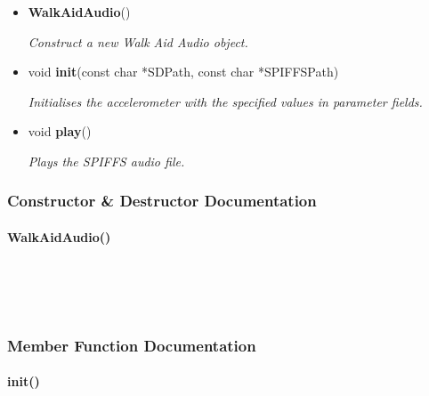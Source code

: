         \begin{itemize}
            \item \textbf{WalkAidAudio}() 
            
                \quad \quad \textit{Construct a new Walk Aid Audio object.}

            \item void \textbf{init}(const char *SDPath, const char *SPIFFSPath) 
            
                \quad \quad \textit{Initialises the accelerometer with the specified values in parameter fields.}

            \item void \textbf{play}() 
            
                \quad \quad \textit{Plays the SPIFFS audio file.}\\

        \end{itemize}

    \subsubsection{Constructor \& Destructor Documentation}\mbox{}


        \paragraph{WalkAidAudio()}\mbox{}\\

            \\

            \\


    \subsubsection{Member Function Documentation}\mbox{}


        \paragraph{init()}\mbox{}\\

            \\

